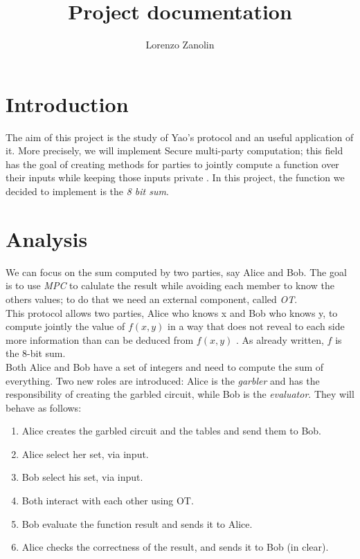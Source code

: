 \documentclass[12pt]{article}
\title{Project documentation}
\author{Lorenzo Zanolin}
\begin{document}
\maketitle

\section{Introduction}
The aim of this project is the study of Yao's protocol \cite{yao} and an useful application of it. More precisely, we will implement Secure multi-party computation; this field has the goal of creating methods for parties to jointly compute a function over their inputs while keeping those inputs private \cite{mpc}. In this project, the function we decided to implement is the \textit{8 bit sum}.

\section{Analysis}
We can focus on the sum computed by two parties, say Alice and Bob. The goal is to use \textit{MPC} to calulate the result while avoiding each member to know the others values; to do that we need an external component, called \textit{OT}.\\ This protocol allows two parties, Alice who
knows x and Bob who knows y, to compute jointly the value of $f(x, y)$ in a way that does not reveal to each side more information than can be deduced from $f(x, y)$ \cite{ot}. As already written, $f$ is the 8-bit sum.\\ Both Alice and Bob have a set of integers and need to compute the sum of everything.
Two new roles are introduced: Alice is the \textit{garbler} and has the responsibility of creating the garbled circuit, while Bob is the \textit{evaluator}.
They will behave as follows:
\begin{enumerate}
    \item Alice creates the garbled circuit and the tables and send them to Bob.
    \item Alice select her set, via input.
    \item Bob select his set, via input.
    \item Both interact with each other using OT.
    \item Bob evaluate the function result and sends it to Alice.
    \item Alice checks the correctness of the result, and sends it to Bob (in clear).
\end{enumerate}
\end{document}
